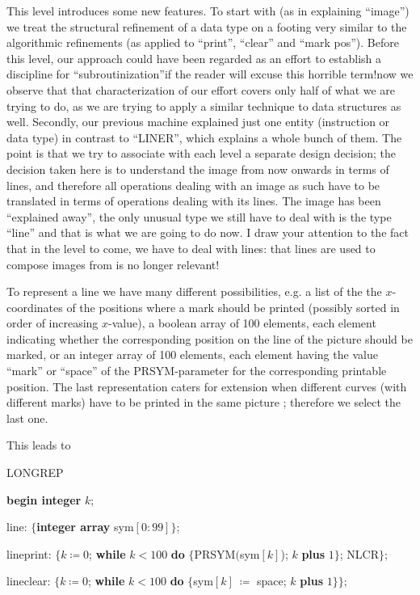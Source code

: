 \documentclass[twoside,11pt]{book}
\begin{document}
This level introduces some new features. To start with (as in explaining ``image'') we treat the structural refinement of a data type on a footing very similar to the algorithmic refinements (as applied to ``print'', ``clear'' and ``mark pos''). Before this level, our approach could have been regarded as an effort to establish a discipline for ``subroutinization''\textemdash{}if the reader will excuse this horrible term!\textemdash{}now we observe that that characterization of  our effort covers only half of what we are trying to do, as we are trying to apply a similar technique to data structures as well. Secondly, our previous machine explained just one entity (instruction or data type) in contrast to ``LINER'', which explains a whole bunch of them. The point is that we try to associate with each level a separate design decision; the decision taken here is to understand the image from now onwards in terms of lines, and therefore all operations dealing with an image as such have to be translated in terms of operations dealing with its lines. The image has been ``explained away'', the only unusual type we still have to deal with is the type ``line'' and that is what we are going to do now. I draw your attention to the fact that in the level to come, we have to deal with lines: that lines are used to compose images from is no longer relevant!

To represent a line we have many different possibilities, e.g. a list of the the $x$-coordinates of the positions where a mark should be printed (possibly sorted in order of increasing $x$-value), a boolean array of 100 elements, each element indicating whether the corresponding position on the line of the picture should be marked, or an integer array of 100 elements, each element having the value ``mark'' or ``space'' of the PRSYM-parameter for the corresponding printable position. The last representation caters for extension when different curves (with different marks) have to be printed in the same picture ; therefore we select the last one.

This leads to

\noindent
LONGREP

\noindent
\textbf{begin integer} $k$;

\noindent
\quad line: $\{$\textbf{integer array} sym$[0 : 99]\}$;

\noindent
\quad lineprint: $\{k \coloneq 0$; \textbf{while} $k < 100$ \textbf{do} $\{$PRSYM$($sym$[k]$); $k$ \textbf{plus} $1\}$; NLCR$\};$

\noindent
\quad lineclear: $\{k \coloneq 0$; \textbf{while} $k < 100$ \textbf{do} $\{$sym$[k]\ \coloneq$ space; $k$ \textbf{plus} $1\}\};$
\end{document}
